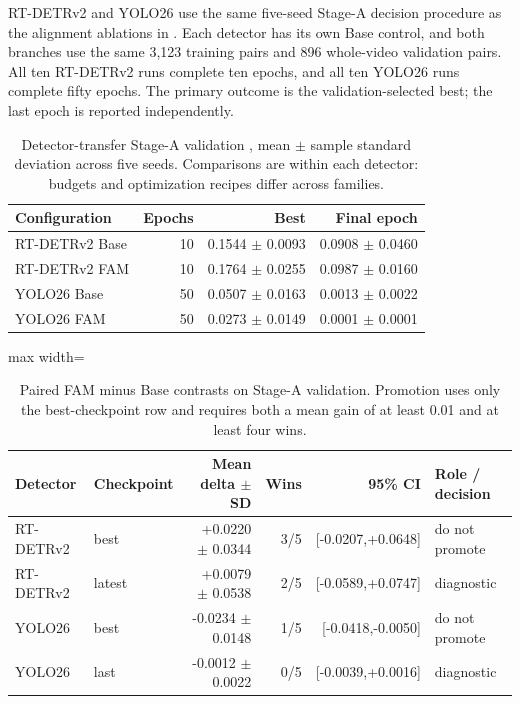 RT-DETRv2 and YOLO26 use the same five-seed Stage-A decision procedure as the
alignment ablations in . Each detector has
its own Base control, and both branches use the same 3,123 training pairs
and 896 whole-video validation pairs. All ten RT-DETRv2 runs complete ten
epochs, and all ten YOLO26 runs complete fifty epochs. The primary outcome is
the validation-selected best; the last epoch is reported independently.

\begin{table}[htbp]
  \centering
  \caption{Detector-transfer Stage-A validation \mapfifty{}, mean \(\pm\)
  sample standard deviation across five seeds. Comparisons are within each
  detector: budgets and optimization recipes differ across families.}
  \label{tab:detector-stage-a-five-seed}
  \begin{tabular}{lrrr}
    \toprule
    Configuration & Epochs & Best & Final epoch \\
    \midrule
    RT-DETRv2 Base & 10 & 0.1544 \(\pm\) 0.0093 & 0.0908 \(\pm\) 0.0460 \\
    RT-DETRv2 FAM & 10 & 0.1764 \(\pm\) 0.0255 & 0.0987 \(\pm\) 0.0160 \\
    YOLO26 Base & 50 & 0.0507 \(\pm\) 0.0163 & 0.0013 \(\pm\) 0.0022 \\
    YOLO26 FAM & 50 & 0.0273 \(\pm\) 0.0149 & 0.0001 \(\pm\) 0.0001 \\
    \bottomrule
  \end{tabular}
\end{table}

\begin{table}[htbp]
  \centering
  \caption{Paired FAM minus Base contrasts on Stage-A validation.
  Promotion uses only the best-checkpoint row and requires both a mean gain
  of at least 0.01 and at least four wins.}
  \label{tab:detector-stage-a-deltas}
  \begin{adjustbox}{max width=\textwidth}
  \begin{tabular}{llrrrl}
    \toprule
    Detector & Checkpoint & Mean delta \(\pm\) SD & Wins & 95\% CI & Role / decision \\
    \midrule
    RT-DETRv2 & best & +0.0220 \(\pm\) 0.0344 & 3/5 & [-0.0207,+0.0648] & do not promote \\
    RT-DETRv2 & latest & +0.0079 \(\pm\) 0.0538 & 2/5 & [-0.0589,+0.0747] & diagnostic \\
    YOLO26 & best & -0.0234 \(\pm\) 0.0148 & 1/5 & [-0.0418,-0.0050] & do not promote \\
    YOLO26 & last & -0.0012 \(\pm\) 0.0022 & 0/5 & [-0.0039,+0.0016] & diagnostic \\
    \bottomrule
  \end{tabular}
  \end{adjustbox}
\end{table}

